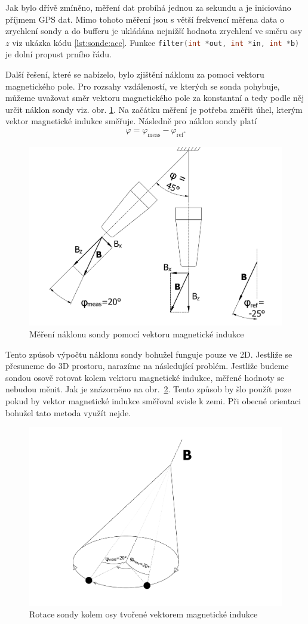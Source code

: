 \documentclass[twoside]{ctuthesis}
\theoremstyle{plain}
\theoremstyle{definition}
\theoremstyle{note}
\begin{document}
	Jak bylo dřívě zmíněno, měření dat probíhá jednou za sekundu a je iniciováno příjmem GPS dat. Mimo tohoto měření jsou s větší frekvencí měřena data o zrychlení sondy a do bufferu je ukládána nejnižší hodnota zrychlení ve směru osy $z$ viz ukázka kódu \ref{lst:sonde:acc}. Funkce \lstinline[language=C]|filter(int *out, int *in, int *b)| je dolní propust prního řádu.
	

	Další řešení, které se nabízelo, bylo zjištění náklonu za pomoci vektoru magnetického pole. Pro rozsahy vzdáleností, ve kterých se sonda pohybuje, můžeme uvažovat směr vektoru magnetického pole za konstantní a tedy podle něj určit náklon sondy viz. obr. \ref{fig:sonda:mag}. Na začátku měření je potřeba změřit úhel, kterým vektor magnetické indukce směřuje. Následně pro náklon sondy platí
	\begin{align}
		\varphi = \varphi_\text{meas} - \varphi_\text{ref}.
	\end{align}

	\begin{figure}
		\centering
		\includegraphics[width=.5\textwidth]{Figures/sonda_naklon_mag.pdf}
		\caption{Měření náklonu sondy pomocí vektoru magnetické indukce}
		\label{fig:sonda:mag}
	\end{figure}

	Tento způsob výpočtu náklonu sondy bohužel funguje pouze ve 2D. Jestliže se přesuneme do 3D prostoru, narazíme na následující problém. Jestliže budeme sondou osově rotovat kolem vektoru magnetické indukce, měřené hodnoty se nebudou měnit. Jak je znázorněno na obr.~\ref{fig:sonda:mag:rot}. Tento způsob by šlo použít poze pokud by vektor magnetické indukce směřoval svisle k zemi. Při obecné orientaci bohužel tato metoda využít nejde.

	\begin{figure}
		\centering
		\includegraphics[width=.5\textwidth]{Figures/sonda_naklon_mag_osova_rotace.pdf}
		\caption{Rotace sondy kolem osy tvořené vektorem magnetické indukce}
		\label{fig:sonda:mag:rot}
	\end{figure}
	
\end{document}
